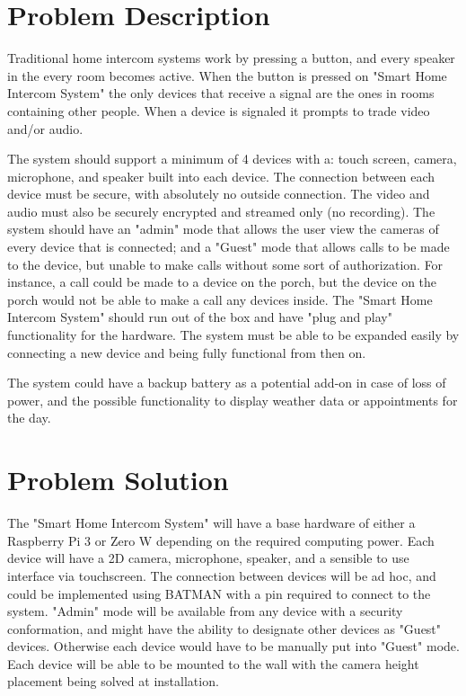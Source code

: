 \documentclass[onecolumn, draftclsnofoot,10pt, compsoc]{IEEEtran}
\begin{document}
\section{Problem Description}
Traditional home intercom systems work by pressing a button, 
and every speaker in the every room becomes active.
When the button is pressed on "Smart Home Intercom System" the only devices that receive a signal are the ones in rooms containing other people. When a device is signaled it prompts to trade video and/or audio.

The system should support a minimum of 4 devices with a: touch screen, camera, microphone, and speaker built into each device. 
The connection between each device must be secure, with absolutely no outside connection. The video and audio must also be securely encrypted and streamed only (no recording). The system should have an "admin" mode that allows the user view the cameras of every device that is connected; and a "Guest" mode that allows calls to be made to the device, but unable to make calls without some sort of authorization. 
For instance, a call could be made to a device on the porch, but the device on the porch would not be able to make a call any devices inside. 
The "Smart Home Intercom System" should run out of the box and have "plug and play" functionality for the hardware. 
The system must be able to be expanded easily by connecting a new device and being fully functional from then on.

The system could have a backup battery as a potential add-on in case of loss of power,
and the possible functionality to display weather data or appointments for the day.



\section{Problem Solution}
The "Smart Home Intercom System" will have a base hardware of either a Raspberry Pi 3 or Zero W depending on the required computing power. 
Each device will have a 2D camera, microphone, speaker, and a sensible to use interface via touchscreen. 
The connection between devices will be ad hoc, and could be implemented using BATMAN with a pin required to connect to the system.
"Admin" mode will be available from any device with a security conformation, and might have the ability to designate other devices as "Guest" devices. 
Otherwise each device would have to be manually put into "Guest" mode.
Each device will be able to be mounted to the wall with the camera height placement being solved at installation.
\end{document}
